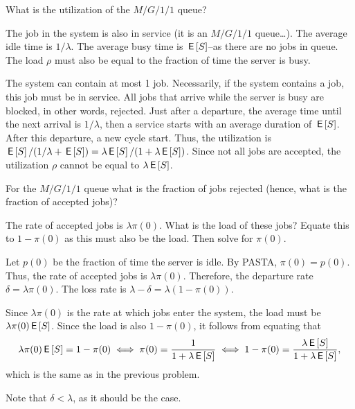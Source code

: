 \begin{exercise}
  What is the utilization of the $M/G/1/1$ queue?  
  \begin{hint}
The job in
    the system is also in service (it is an $M/G/1/1$ queue\ldots).
    The average idle time is $1/\lambda$. The average busy time is
    $\,\mathsf{E}\left[S\right]$--as there are no jobs in queue. The load $\rho$ must also
    be equal to the fraction of time the server is busy. 
  \end{hint}
  \begin{solution}
 The system can contain at most 1 job. Necessarily, if the
      system contains a job, this job must be in service.  All jobs
      that arrive while the server is busy are blocked, in other
      words, rejected.  Just after a departure, the average time until
      the next arrival is $1/\lambda$, then a service starts with an
      average duration of $\,\mathsf{E}\left[S\right]$. After this departure, a new cycle
      start. Thus, the utilization is
      $\,\mathsf{E}\left[S\right]/(1/\lambda + \,\mathsf{E}\left[S\right]) = \lambda \,\mathsf{E}\left[S\right]/ (1 + \lambda \,\mathsf{E}\left[S\right])$.
      Since not all jobs are accepted, the utilization $\rho$ cannot
      be equal to $\lambda \,\mathsf{E}\left[S\right]$.
  \end{solution}
\end{exercise}

\begin{exercise}
  For the $M/G/1/1$ queue what is the fraction of jobs rejected
  (hence, what is the fraction of accepted jobs)?  
  \begin{hint}
The rate of
    accepted jobs is $\lambda \pi(0)$. What is the load of these jobs?
    Equate this to $1-\pi(0)$ as this must also be the load. Then solve for $\pi(0)$.
  \end{hint}
  \begin{solution}
    Let $p(0)$ be the fraction of time the server is idle. By PASTA,
    $\pi(0)=p(0)$. Thus, the rate of accepted jobs is
    $\lambda\pi(0)$. Therefore, the departure rate
    $\delta=\lambda\pi(0)$. The loss rate is
    $\lambda-\delta = \lambda (1-\pi(0))$.

    Since $\lambda\pi(0)$ is the rate at which jobs enter the system,
    the load must be $\lambda\pi(0)\,\mathsf{E}\left[S\right]$. Since the load is also
    $1-\pi(0)$, it follows from equating that
    \begin{equation*}
      \lambda\pi(0) \,\mathsf{E}\left[S\right] = 1 - \pi(0) \iff \pi(0)=\frac1{1+\lambda\,\mathsf{E}\left[S\right]} 
\iff 1-\pi(0) = \frac{\lambda \,\mathsf{E}\left[S\right]}{1+\lambda \,\mathsf{E}\left[S\right]},
    \end{equation*}
which is the same as in the previous problem.

Note that  $\delta < \lambda$, as it should be the case. 
  \end{solution}
\end{exercise}


